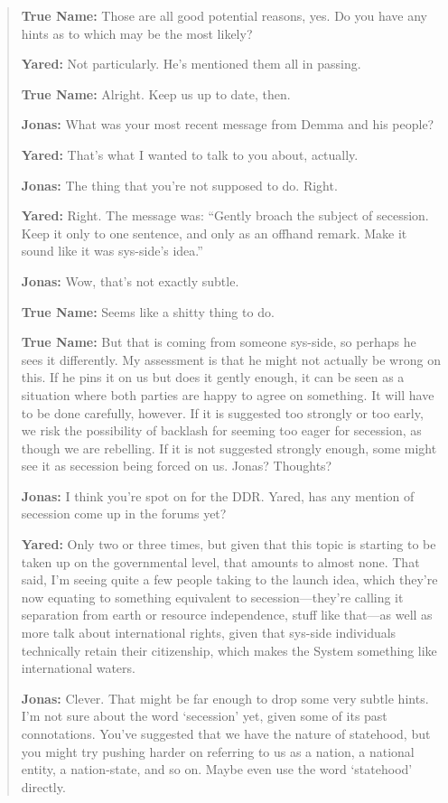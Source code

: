 \begin{quote}
\textbf{True Name:} Those are all good potential reasons, yes. Do you have any hints as to which may be the most likely?

\textbf{Yared:} Not particularly. He's mentioned them all in passing.

\textbf{True Name:} Alright. Keep us up to date, then.

\textbf{Jonas:} What was your most recent message from Demma and his people?

\textbf{Yared:} That's what I wanted to talk to you about, actually.

\textbf{Jonas:} The thing that you're not supposed to do. Right.

\textbf{Yared:} Right. The message was: ``Gently broach the subject of secession. Keep it only to one sentence, and only as an offhand remark. Make it sound like it was sys-side's idea.''

\textbf{Jonas:} Wow, that's not exactly subtle.

\textbf{True Name:} Seems like a shitty thing to do.

\textbf{True Name:} But that is coming from someone sys-side, so perhaps he sees it differently. My assessment is that he might not actually be wrong on this. If he pins it on us but does it gently enough, it can be seen as a situation where both parties are happy to agree on something. It will have to be done carefully, however. If it is suggested too strongly or too early, we risk the possibility of backlash for seeming too eager for secession, as though we are rebelling. If it is not suggested strongly enough, some might see it as secession being forced on us. Jonas? Thoughts?

\textbf{Jonas:} I think you're spot on for the DDR. Yared, has any mention of secession come up in the forums yet?

\textbf{Yared:} Only two or three times, but given that this topic is starting to be taken up on the governmental level, that amounts to almost none. That said, I'm seeing quite a few people taking to the launch idea, which they're now equating to something equivalent to secession---they're calling it separation from earth or resource independence, stuff like that---as well as more talk about international rights, given that sys-side individuals technically retain their citizenship, which makes the System something like international waters.

\textbf{Jonas:} Clever. That might be far enough to drop some very subtle hints. I'm not sure about the word `secession' yet, given some of its past connotations. You've suggested that we have the nature of statehood, but you might try pushing harder on referring to us as a nation, a national entity, a nation-state, and so on. Maybe even use the word `statehood' directly.


\end{quote}
